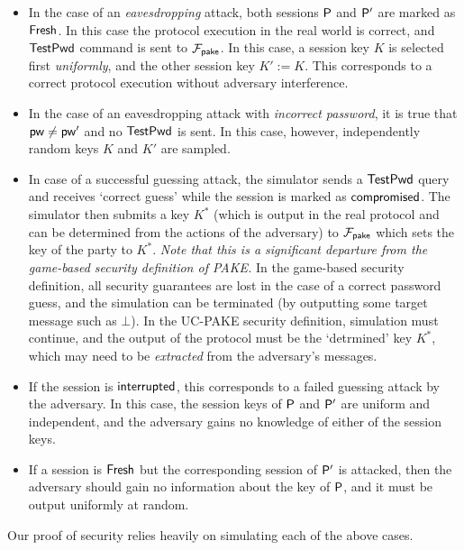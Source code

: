 	\begin{itemize}
		\item In the case of an \textit{eavesdropping} attack, both sessions $\mathsf{P}$ and $\mathsf{P}'$ are marked as $\mathsf{Fresh}$. In this case the protocol execution in the real world is correct, and $\mathsf{TestPwd}$ command is sent to $\mathcal{F}_{\mathsf{pake}}$. In this case, a session key $K$ is selected first \textit{uniformly}, and the other session key $K':=K$. This corresponds to a correct protocol execution without adversary interference.
		\item In the case of an eavesdropping attack with \textit{incorrect password}, it is true that $\mathsf{pw}\neq\mathsf{pw}'$ and no $\mathsf{TestPwd}$ is sent. In this case, however, independently random keys $K$ and $K'$ are sampled.
		\item In case of a successful guessing attack, the simulator sends a $\mathsf{TestPwd}$ query and receives `correct guess' while the session is marked as $\mathsf{compromised}$. The simulator then submits a key $K^{*}$ (which is output in the real protocol and can be determined from the actions of the adversary) to $\mathcal{F}_{\mathsf{pake}}$ which sets the key of the party to $K^{*}$. \textit{Note that this is a significant departure from the game-based security definition of PAKE.} In the game-based security definition, all security guarantees are lost in the case of a correct password guess, and the simulation can be terminated (by outputting some target message such as $\bot$). In the UC-PAKE security definition, simulation must continue, and the output of the protocol must be the `detrmined' key $K^{*}$, which may need to be \textit{extracted} from the adversary's messages.
		\item If the session is $\mathsf{interrupted}$, this corresponds to a failed guessing attack by the adversary. In this case, the session keys of $\mathsf{P}$ and $\mathsf{P}'$ are uniform and independent, and the adversary gains no knowledge of either of the session keys.
		\item If a session is $\mathsf{Fresh}$ but the corresponding session of $\mathsf{P}'$ is attacked, then the adversary should gain no information about the key of $\mathsf{P}$, and it must be output uniformly at random.
	\end{itemize}
	
	Our proof of security relies heavily on simulating each of the above cases.
	
	
	
%			
